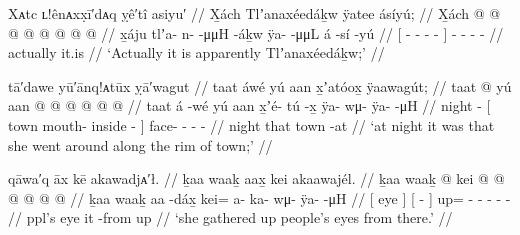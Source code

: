 \ex\label{ex:94-8-actually-wealth-woman}%
%
\begingl
	\glpreamble	Xᴀtc ʟ!ênᴀxx̣ī′dᴀq ỵê′tî asiyu′ //
	\glpreamble	X̱ách Tlʼanaxéedáḵw ÿatee ásíyú; //
	\gla	X̱ách {}  @ {} @ {} @ {} @ {} {}
		 @ {} @ {}
		 @ {} @ {} //
	\glb	x̱áju {} tlʼa- n-  -μμH -áḵw {} 
		ÿa-  -μμL
		á -sí -yú //
	\glc	{} {}[ - -  - - {}]
		-  -
		 - - //
	\gld	actually {}  {} {} {} {} {}
		 {} {}
		it.is  {} //
	\glft	‘Actually it is apparently Tlʼanaxéedáḵw;’
		//
\endgl
\xe




\ex\label{ex:94-9-night-went-town-rim}%
%
\begingl
	\glpreamble	tā′dawe yū′ānq!ᴀtūx ỵā′wagut //
	\glpreamble	taat áwé yú aan x̱ʼatóox̱ ÿaawagút; //
	\gla	taat  @ {} {} yú aan  @ {} @ {} {}
		 @ {} @ {} @ {} @ {} //
	\glb	taat á -wé {} yú aan x̱ʼé- tú -x̱ {}
		ÿa- wμ- ÿa-  -μH //
	\glc	night  - {}[  town mouth- inside - {}]
		face- - -  - //
	\gld	night  {} {} that town  {} -at {}
		 {} {} {} {} //
	\glft	‘at night it was that she went around along the rim of town;’
		//
\endgl
\xe



\ex\label{ex:94-10-took-peoples-eyes}%
%
\begingl
	\glpreamble	qāwa′q āx kē akawadjᴀ′ł. //
	\glpreamble	ḵaa waaḵ aax̱ kei akaawajél. //
	\gla	{} ḵaa waaḵ {} {}  @ {} {}
		kei @  @ {} @ {} @ {} @ {} @ {} //
	\glb	{} ḵaa waaḵ {} {} aa -dáx̱ {}
		kei= a- ka- wμ- ÿa-  -μH //
	\glc	{}[  eye {}] {}[  - {}]
		up= - - - -  - //
	\gld	{} ppl’s eye {} {} it -from {}
		up\•  {} {} {} {} {} //
	\glft	‘she gathered up people’s eyes from there.’
		//
\endgl
\xe

